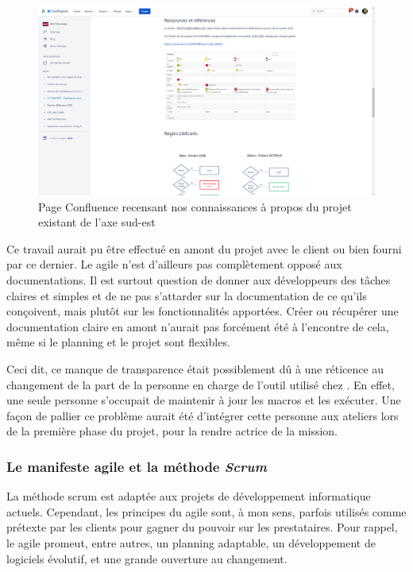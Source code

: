 \begin{figure}[H]
  \centering
  \includegraphics[width=1\linewidth]{img/confluence_sycomores_explications.png}
  \caption{Page Confluence recensant nos connaissances à propos du projet existant de l'axe sud-est}
\end{figure}

Ce travail aurait pu être effectué en amont du projet avec le client ou bien fourni par ce dernier. Le \gls{agile} n'est d'ailleurs pas complètement opposé aux documentations. Il est surtout question de donner aux développeurs des tâches claires et simples et de ne pas s'attarder sur la documentation de ce qu'ils conçoivent, mais plutôt sur les fonctionnalités apportées. Créer ou récupérer une documentation claire en amont n'aurait pas forcément été à l'encontre de cela, même si le planning et le projet sont flexibles.

Ceci dit, ce manque de transparence était possiblement dû à une réticence au changement de la part de la personne en charge de l'outil utilisé chez \sncf. En effet, une seule personne s'occupait de maintenir à jour les macros et les exécuter. Une façon de pallier ce problème aurait été d'intégrer cette personne aux ateliers lors de la première phase du projet, pour la rendre actrice de la mission.

\subsubsection{Le manifeste agile et la méthode \textit{Scrum}}

La méthode \gls{scrum} est adaptée aux projets de développement informatique actuels. Cependant, les principes du \gls{agile} sont, à mon sens, parfois utilisés comme prétexte par les clients pour gagner du pouvoir sur les prestataires. Pour rappel, le \gls{agile} promeut, entre autres, un planning adaptable, un développement de logiciels évolutif, et une grande ouverture au changement.

